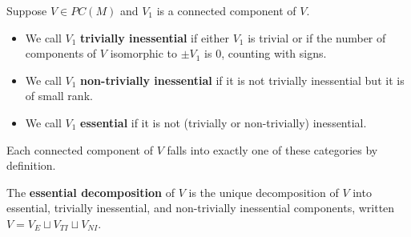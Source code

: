 \begin{definition}\label{D: essential}
	Suppose $V \in PC(M)$ and $V_1$ is a connected component of $V$.
	\begin{itemize}
		\item We call $V_1$ \textbf{trivially inessential} if either
		$V_1$ is trivial or if the number of components of
		$V$ isomorphic to $\pm V_1$ is $0$, counting with signs.

		\item We call ${V_1}$ \textbf{non-trivially inessential} if it is not trivially inessential but it is of small rank.

		\item We call ${V_1}$ \textbf{essential} if it is not (trivially or non-trivially) inessential.
	\end{itemize}

	Each connected component of $V$ falls into exactly one of these categories by definition.

	The \textbf{essential decomposition} of $V$ is the unique decomposition of $V$ into essential, trivially inessential, and non-trivially inessential components,
	written $V = V_E \sqcup V_{TI} \sqcup V_{NI}$.
\end{definition}

